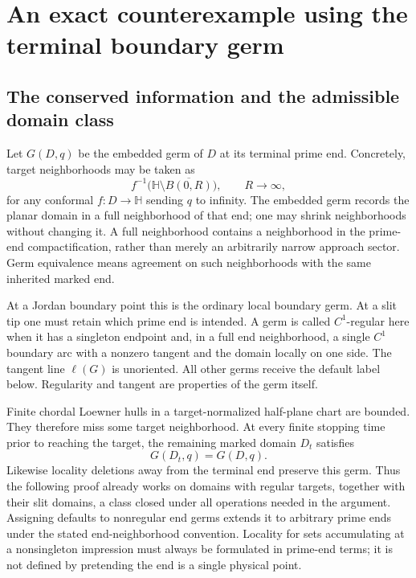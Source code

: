 \documentclass[11pt]{article}
\theoremstyle{definition}\newtheorem{definition}[theorem]{Definition}
\theoremstyle{remark}\newtheorem{remark}[theorem]{Remark}
\newcommand{\HH}{\mathbb H}
\begin{document}
\section{An exact counterexample using the terminal boundary germ}
\label{sec:target-germ}

\subsection{The conserved information and the admissible domain class}

Let $G(D,q)$ be the embedded germ of $D$ at its terminal prime end.
Concretely, target neighborhoods may be taken as
\[
 f^{-1}\bigl(\HH\setminus\overline{B(0,R)}\bigr),\qquad R\to\infty,
\]
for any conformal $f:D\to\HH$ sending $q$ to infinity. The embedded
germ records the planar domain in a full neighborhood of that end;
one may shrink neighborhoods without changing it. A full neighborhood
contains a neighborhood in the prime-end compactification, rather than
merely an arbitrarily narrow approach sector. Germ equivalence means
agreement on such neighborhoods with the same inherited marked end.

At a Jordan boundary point this is the ordinary local boundary germ.
At a slit tip one must retain which prime end is intended. A germ is
called $C^1$-regular here when it has a singleton endpoint and, in a full
end neighborhood, a single $C^1$ boundary arc with a nonzero tangent and
the domain locally on one side. The tangent line $\ell(G)$ is unoriented.
All other germs receive the default label below. Regularity and tangent
are properties of the germ itself.

Finite chordal Loewner hulls in a target-normalized half-plane chart are
bounded. They therefore miss some target neighborhood. At every finite
stopping time prior to reaching the target, the remaining marked domain
$D_t$ satisfies
\begin{equation}
 G(D_t,q)=G(D,q).
 \label{eq:germ-persistent}
\end{equation}
Likewise locality deletions away from the terminal end preserve this germ.
Thus the following proof already works on domains with regular targets,
together with their slit domains, a class closed under all operations
needed in the argument. Assigning defaults to nonregular end germs extends
it to arbitrary prime ends under the stated end-neighborhood convention.
Locality for sets accumulating at a nonsingleton impression must always be
formulated in prime-end terms; it is not defined by pretending the end is
a single physical point.
\end{document}
